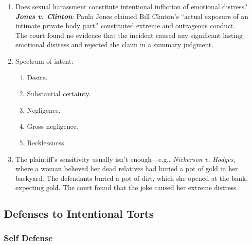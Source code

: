 \begin{enumerate}
    \item Does sexual harassment constitute intentional infliction of emotional distress? \textbf{\emph{Jones v. Clinton}}: Paula Jones claimed Bill Clinton's ``actual exposure of an intimate private body part'' constituted extreme and outrageous conduct. The court found no evidence that the incident caused any significant lasting emotional distress and rejected the claim in a summary judgment.
    \item Spectrum of intent:
    \begin{enumerate}
        \item Desire.
        \item Substantial certainty.
        \item Negligence.
        \item Gross negligence.
        \item Recklessness.
    \end{enumerate}
    \item The plaintiff's sensitivity usually isn't enough---e.g., \emph{Nickerson v. Hodges}, where a woman believed her dead relatives had buried a pot of gold in her backyard. The defendants buried a pot of dirt, which she opened at the bank, expecting gold. The court found that the joke caused her extreme distress.
\end{enumerate}

\subsection{Defenses to Intentional Torts}


\subsubsection{Self Defense}




